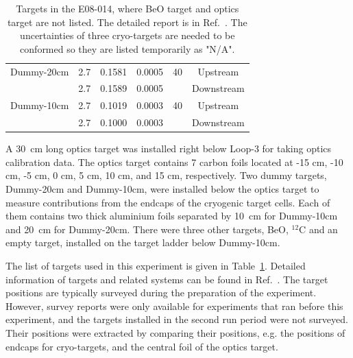 \begin{table}[htbp]
\begin{tabular}{lccccc}
   Dummy-20cm       &      2.7               & 0.1581        &     0.0005             &40           & Upstream  \\
                    &      2.7               & 0.1589        &     0.0005             &             & Downstream\\
   Dummy-10cm       &      2.7               & 0.1019        &     0.0003             &40           & Upstream  \\
                    &      2.7               & 0.1000        &     0.0003             &             & Downstream\\        
   \bottomrule
   \end{tabular}
  \caption[Targets in the E08-014]{\footnotesize{Targets in the E08-014, where BeO target and optics target are not listed. The detailed report is in Ref.~\cite{target_report}. The uncertainties of three cryo-targets are needed to be conformed so they are listed temporarily as "N/A". }}
  \label{target_table}
  \end{table}
  
   A 30~cm long optics target was installed right below Loop-3 for taking optics calibration data. The optics target contains 7 carbon foils located at -15 cm, -10 cm, -5 cm, 0 cm, 5 cm, 10 cm, and 15 cm, respectively. Two dummy targets, Dummy-20cm and Dummy-10cm, were installed below the optics target to measure contributions from the endcaps of the cryogenic target cells. Each of them contains two thick aluminium foils separated by 10~cm for Dummy-10cm and 20~cm for Dummy-20cm. There were three other targets, BeO, $\mathrm{^{12}C}$ and an empty target, installed on the target ladder below Dummy-10cm. 
 
  The list of targets used in this experiment is given in Table~\ref{target_table}. Detailed information of targets and related systems can be found in Ref.~\cite{target_report}. The target positions are typically surveyed during the preparation of the experiment. However, survey reports were only available for experiments that ran before this experiment, and the targets installed in the second run period were not surveyed. Their positions were extracted by comparing their positions, e.g. the positions of endcaps for cryo-targets, and the central foil of the optics target.
  
